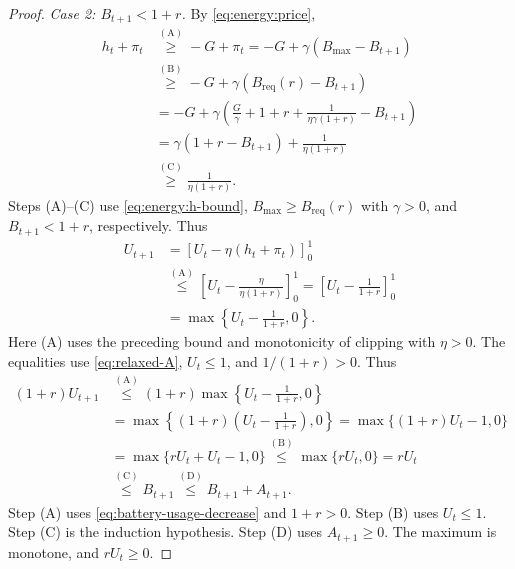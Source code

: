 \begin{proof}
\emph{Case 2: $B_{t+1}<1+r$.} By \eqref{eq:energy:price},
\begin{equation}\label{eq:energy:low-battery-estimates}
\begin{aligned}
 h_t+\pi_t
 &\overset{\mathrm{(A)}}{\geq}-G+\pi_t
   =-G+\gamma(B_{\mathrm{max}}-B_{t+1})\\
 &\overset{\mathrm{(B)}}{\geq}-G+\gamma(B_{\mathrm{req}}(r)-B_{t+1})\\
 &=-G+\gamma\left(\frac G\gamma+1+r
              +\frac{1}{\eta\gamma(1+r)}-B_{t+1}\right)\\
 &=\gamma(1+r-B_{t+1})+\frac{1}{\eta(1+r)}\\
 &\overset{\mathrm{(C)}}{\geq}\frac{1}{\eta(1+r)}.
\end{aligned}
\end{equation}
Steps (A)--(C) use \eqref{eq:energy:h-bound},
$B_{\mathrm{max}}\geq B_{\mathrm{req}}(r)$ with $\gamma>0$, and
$B_{t+1}<1+r$, respectively.
Thus
\begin{equation}\label{eq:battery-usage-decrease}
\begin{aligned}
 U_{t+1}
 &=[U_t-\eta(h_t+\pi_t)]_0^1\\
 &\overset{\mathrm{(A)}}{\leq}
       \left[U_t-\frac{\eta}{\eta(1+r)}\right]_0^1
   =\left[U_t-\frac{1}{1+r}\right]_0^1\\
 &=\max\left\{U_t-\frac{1}{1+r},0\right\}.
\end{aligned}
\end{equation}
Here (A) uses the preceding bound and monotonicity of clipping with $\eta>0$.
The equalities use \eqref{eq:relaxed-A}, $U_t\leq1$, and $1/(1+r)>0$. Thus
\begin{equation}\label{eq:energy:reserve-low}
\begin{aligned}
 (1+r)U_{t+1}
 &\overset{\mathrm{(A)}}{\leq}
      (1+r)\max\left\{U_t-\frac{1}{1+r},0\right\}\\
 &=\max\left\{(1+r)\left(U_t-\frac{1}{1+r}\right),0\right\}
   =\max\{(1+r)U_t-1,0\}\\
 &=\max\{rU_t+U_t-1,0\}
   \overset{\mathrm{(B)}}{\leq}\max\{rU_t,0\}=rU_t\\
 &\overset{\mathrm{(C)}}{\leq}B_{t+1}
   \overset{\mathrm{(D)}}{\leq}B_{t+1}+A_{t+1}.
\end{aligned}
\end{equation}
Step (A) uses \eqref{eq:battery-usage-decrease} and $1+r>0$.
Step (B) uses $U_t\leq1$. Step (C) is the induction hypothesis. Step (D) uses
$A_{t+1}\geq0$. The maximum is monotone, and $rU_t\geq0$.


\end{proof}
